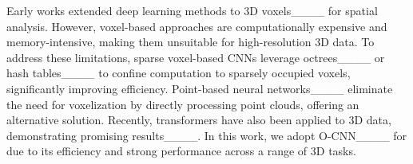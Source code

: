 Early works extended deep learning methods to 3D voxels____ for spatial analysis.
However, voxel-based approaches are computationally expensive and memory-intensive, making them unsuitable for high-resolution 3D data.
To address these limitations, sparse voxel-based CNNs leverage octrees____ or hash tables____ to confine computation to sparsely occupied voxels, significantly improving efficiency.
Point-based neural networks____ eliminate the need for voxelization by directly processing point clouds, offering an alternative solution.
Recently, transformers have also been applied to 3D data, demonstrating promising results____.
In this work, we adopt O-CNN____ for \accessAna due to its efficiency and strong performance across a range of 3D tasks.




\begin{comment}



\paragraph{Design for Manufacturing}


topology optimization____
topology optimization (visibility map)____
topology optimization____

design for manufacturing (DFM)____

Mold part design(fictitious physical models for manufacturability)____

Robot Manipulation and Grasping____

========================
========================



\end{comment}
